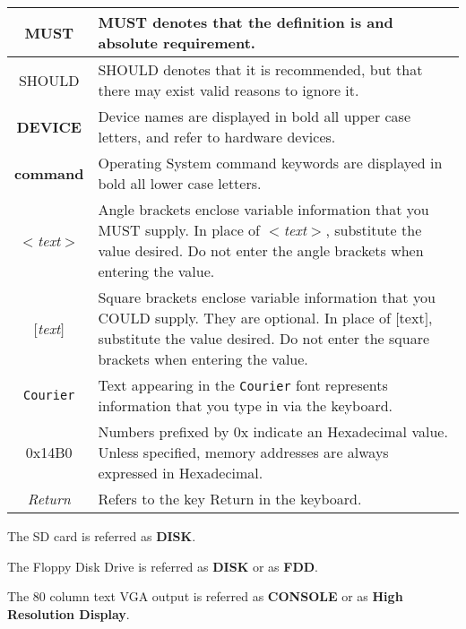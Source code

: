 \documentclass[a4paper,11pt]{article}
\begin{document}
    \begin{center}
        \begin{tabular}{c m{14cm}}
            \hline
            MUST & MUST denotes that the definition is and absolute
            requirement.\\
            \hline
            SHOULD & SHOULD denotes that it is recommended, but that there may
            exist valid reasons to ignore it.\\
            \hline
            \textbf{DEVICE} & Device names are displayed in bold all upper case 
            letters, and refer to hardware devices.\\
            \hline
            \textbf{command} & Operating System command keywords are displayed 
            in bold all lower case letters.\\
            \hline
            \textit{$<$text$>$} & Angle brackets enclose variable information 
            that you MUST supply. In place of \textit{$<$text$>$}, substitute 
            the value desired. Do not enter the angle brackets when entering the
            value.\\
            \hline
            \textit{$[$text$]$} & Square brackets enclose variable information
            that you COULD supply. They are optional. In place of $[$text$]$,
            substitute the value desired. Do not enter the square brackets when
            entering the value.\\
            \hline
            \texttt{Courier} & Text appearing in the \texttt{Courier} font 
            represents information that you type in via the keyboard.\\
            \hline
            0x14B0 & Numbers prefixed by 0x indicate an Hexadecimal value.
            Unless specified, memory addresses are always expressed in
            Hexadecimal.\\
            \hline
            \textit{Return} & Refers to the key Return in the keyboard.\\
            \hline
        \end{tabular}
    \end{center}

    \hfill\break
    \hfill\break

    The SD card is referred as \textbf{DISK}.

    The Floppy Disk Drive is referred as \textbf{DISK} or as \textbf{FDD}.

    The 80 column text VGA output is referred as \textbf{CONSOLE} or as
    \textbf{High Resolution Display}.
\end{document}
